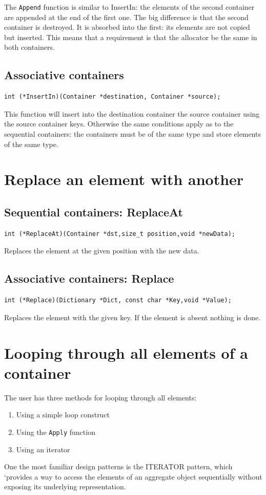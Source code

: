 \documentclass[12pt,a4paper]{memoir} %
\begin{document}
The \texttt{Append} function is similar to InsertIn: the elements of the second container are appended at the end of the first one. The big difference 
is that the second container is destroyed. It is absorbed into the first: its elements are not copied but inserted. This means that a requirement is
that the allocator be the same in both containers.
\subsection{Associative containers}
\begin{verbatim}
int (*InsertIn)(Container *destination, Container *source);
\end{verbatim}
This function will insert into the destination container the source container using the source container keys. Otherwise the same conditions apply as to the sequential containers: the containers must be of the same type and store elements of the same type.
\section{Replace an element with another}
\subsection{Sequential containers: ReplaceAt}
\begin{verbatim}
int (*ReplaceAt)(Container *dst,size_t position,void *newData);
\end{verbatim}
Replaces the element at the given position with the new data. 
\subsection{Associative containers: Replace}
\begin{verbatim}
int (*Replace)(Dictionary *Dict, const char *Key,void *Value);
\end{verbatim}
Replaces the element with the given key. If the element is absent nothing is done.
\section{Looping through all elements of a container}
The user has  three methods for looping through all elements:
\begin{enumerate}
\item Using a simple loop construct
\item Using the \verb,Apply, function
\item Using an iterator
\end{enumerate}
One the most familiar design patterns  is the ITERATOR pattern, which ‘provides a way to access the elements of an aggregate object sequentially without exposing its underlying representation. 
\end{document}

